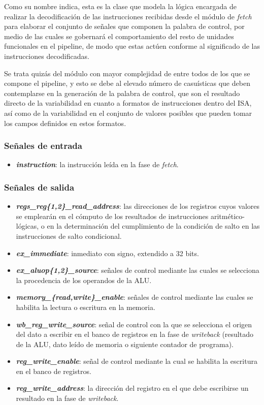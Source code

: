 Como su nombre indica, esta es la clase que modela la lógica encargada de realizar la decodificación de las instrucciones recibidas desde el módulo de \textit{fetch} para elaborar el conjunto de señales que componen la palabra de control, por medio de las cuales se gobernará el comportamiento del resto de unidades funcionales en el pipeline, de modo que estas actúen conforme al significado de las instrucciones decodificadas.

Se trata quizás del módulo con mayor complejidad de entre todos de los que se compone el pipeline, y esto se debe al elevado número de casuísticas que deben contemplarse en la generación de la palabra de control, que son el resultado directo de la variabilidad en cuanto a formatos de instrucciones dentro del ISA, así como de la variabilidad en el conjunto de valores posibles que pueden tomar los campos definidos en estos formatos.

\subsubsection{Señales de entrada}

\begin{itemize}
  \item \textbf{\textit{instruction}}: la instrucción leída en la fase de \textit{fetch}.
\end{itemize}

\subsubsection{Señales de salida}

\begin{itemize}
  \item \textbf{\textit{regs\_reg\{1,2\}\_read\_address}}: las direcciones de los registros cuyos valores se emplearán en el cómputo de los resultados de instrucciones aritmético-lógicas, o en la determinación del cumplimiento de la condición de salto en las instrucciones de salto condicional.
  \vspace{-0.2cm}
  \item \textbf{\textit{ex\_immediate}}: inmediato con signo, extendido a 32 bits.
  \item \textbf{\textit{ex\_aluop\{1,2\}\_source}}: señales de control mediante las cuales se selecciona la procedencia de los operandos de la ALU.
  \item \textbf{\textit{memory\_\{read,write\}\_enable}}: señales de control mediante las cuales se habilita la lectura o escritura en la memoria.
  \item \textbf{\textit{wb\_reg\_write\_source}}: señal de control con la que se selecciona el origen del dato a escribir en el banco de registros en la fase de \textit{writeback} (resultado de la ALU, dato leído de memoria o siguiente contador de programa).
  \item \textbf{\textit{reg\_write\_enable}}: señal de control mediante la cual se habilita la escritura en el banco de registros.
  \item \textbf{\textit{reg\_write\_address}}: la dirección del registro en el que debe escribirse un resultado en la fase de \textit{writeback}.
\end{itemize}

